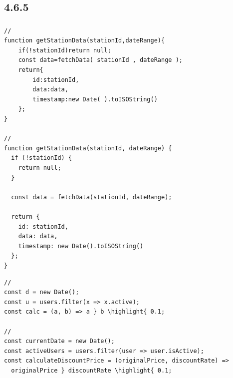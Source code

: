 \hypertarget{section-44}{%
\subsection{4.6.5}\label{section-44}}

\hypertarget{section-45}{%
\subsubsection{}\label{section-45}}

\important{}

\important{}

\important{}

\important{}

\begin{lstlisting}[style=javascript]
// 
function getStationData(stationId,dateRange){
    if(!stationId)return null;
    const data=fetchData( stationId , dateRange );
    return{
        id:stationId,
        data:data,
        timestamp:new Date( ).toISOString()
    };
}

// 
function getStationData(stationId, dateRange) {
  if (!stationId) {
    return null;
  }
  
  const data = fetchData(stationId, dateRange);
  
  return {
    id: stationId,
    data: data,
    timestamp: new Date().toISOString()
  };
}
\end{lstlisting}

\important{}

\important{}

\begin{lstlisting}[style=javascript]
// 
const d = new Date();
const u = users.filter(x => x.active);
const calc = (a, b) => a } b \highlight{ 0.1;

// 
const currentDate = new Date();
const activeUsers = users.filter(user => user.isActive);
const calculateDiscountPrice = (originalPrice, discountRate) => 
  originalPrice } discountRate \highlight{ 0.1;
\end{lstlisting}

\important{}


